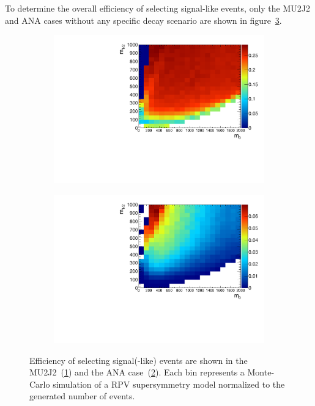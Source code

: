 To determine the overall efficiency of selecting signal-like events, only the MU2J2 and ANA cases without any specific decay scenario are shown in figure~\ref{fig:sigeff}.

\begin{figure}[ht!]
  \centering
  \begin{subfigure}[b]{0.495\textwidth}
    \centering
    \includegraphics[width=\textwidth]{plots/hSignalRatio.pdf}
    \caption{\label{fig:sig}}
  \end{subfigure}
  \begin{subfigure}[b]{0.495\textwidth}
    \centering
    \includegraphics[width=\textwidth]{plots/hCutSignalRatio.pdf}
    \caption{\label{fig:cutsig}}
  \end{subfigure}
  \caption{Efficiency of selecting signal(-like) events are shown in the MU2J2~(\ref{fig:sig}) and the ANA case~(\ref{fig:cutsig}). Each bin represents a Monte-Carlo simulation of a RPV supersymmetry model normalized to the generated number of events.}
  \label{fig:sigeff}
\end{figure}

